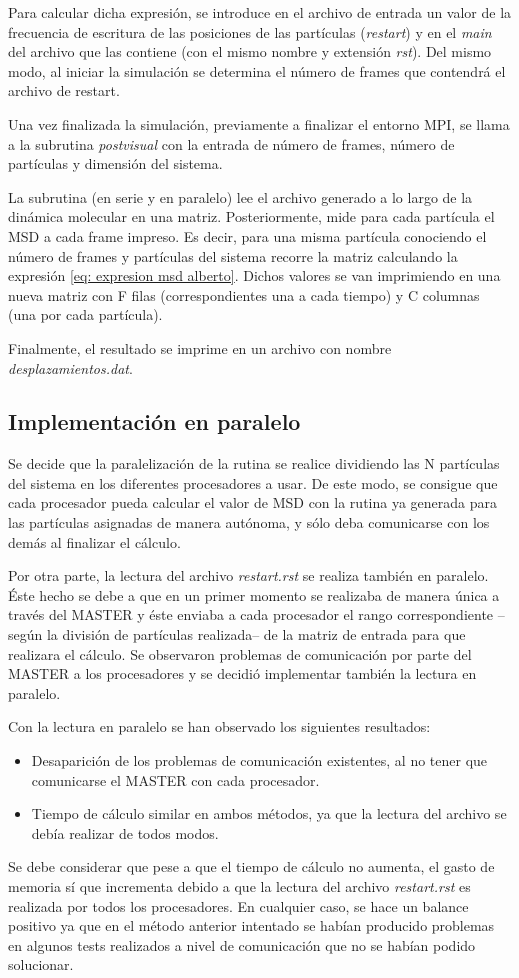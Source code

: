 \documentclass[onecolumn]{article}
\renewcommand{\it}[1]{\textit{#1}}
\begin{document}
Para calcular dicha expresión, se introduce en el archivo de entrada un valor de la frecuencia de escritura de las posiciones de las partículas (\it{restart}) y en el  \it{main} del archivo que las contiene (con el mismo nombre y extensión \it{rst}). Del mismo modo, al iniciar la simulación se determina el número de frames que contendrá el archivo de restart.

Una vez finalizada la simulación, previamente a finalizar el entorno MPI, se llama a la subrutina \it{postvisual} con la entrada de número de frames, número de partículas y dimensión del sistema.

La subrutina (en serie y en paralelo) lee el archivo generado a lo largo de la dinámica molecular en una matriz. Posteriormente, mide para cada partícula el MSD a cada frame impreso. Es decir, para una misma partícula conociendo el número de frames y partículas del sistema recorre la matriz calculando la expresión \eqref{eq: expresion msd alberto}. Dichos valores se van imprimiendo en una nueva matriz con F filas (correspondientes una a cada tiempo) y C columnas (una por cada partícula).

Finalmente, el resultado se imprime en un archivo con nombre \it{desplazamientos.dat}.

\subsection{Implementación en paralelo}
Se decide que la paralelización de la rutina se realice dividiendo las N partículas del sistema en los diferentes procesadores a usar. De este modo, se consigue que cada procesador pueda calcular el valor de MSD con la rutina ya generada para las partículas asignadas de manera autónoma, y sólo deba comunicarse con los demás al finalizar el cálculo.

Por otra parte, la lectura del archivo \it{restart.rst} se realiza también en paralelo. Éste hecho se debe a que en un primer momento se realizaba de manera única a través del MASTER y éste enviaba a cada procesador el rango correspondiente --según la división de partículas realizada-- de la matriz de entrada para que realizara el cálculo. Se observaron problemas de comunicación por parte del MASTER a los procesadores y se decidió implementar también la lectura en paralelo.

Con la lectura en paralelo se han observado los siguientes resultados:
\begin{itemize}
\item Desaparición de los problemas de comunicación existentes, al no tener que comunicarse el MASTER con cada procesador.
\item Tiempo de cálculo similar en ambos métodos, ya que la lectura del archivo se debía realizar de todos modos.
\end{itemize}
Se debe considerar que pese a que el tiempo de cálculo no aumenta, el gasto de memoria sí que incrementa debido a que la lectura del archivo \it{restart.rst} es realizada por todos los procesadores. En cualquier caso, se hace un balance positivo ya que en el método anterior intentado se habían producido problemas en algunos tests realizados a nivel de comunicación que no se habían podido solucionar.
\end{document}
